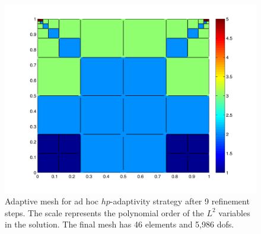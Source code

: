 \begin{figure}[h!b!p!]
\centering
\includegraphics[scale=0.60]{./figures/cavityFlowPolyOrder.pdf}
\caption{Adaptive mesh for ad hoc $hp$-adaptivity strategy after 9 refinement steps.  The scale represents the polynomial order of the $L^{2}$ variables in the solution.  The final mesh has 46 elements and 5,986 dofs.
}
\label{fig:cavityFlowPolyOrder}
\end{figure}